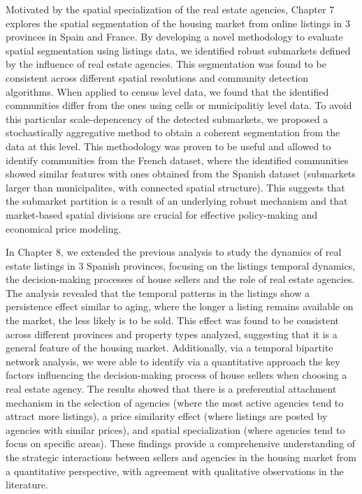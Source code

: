 Motivated by the spatial specialization of the real estate agencies, Chapter 7 explores the spatial segmentation of the housing market from online listings in 3 provinces in Spain and France. By developing a novel methodology to evaluate spatial segmentation using listings data, we identified robust submarkets defined by the influence of real estate agencies. This segmentation was found to be consistent across different spatial resolutions and community detection algorithms. When applied to census level data, we found that the identified communities differ from the ones using cells or municipalitiy level data. To avoid this particular scale-depencency of the detected submarkets, we proposed a stochastically aggregative method to obtain a coherent segmentation from the data at this level. This methodology was proven to be useful and allowed to identify communities from the French dataset, where the identified communities showed similar features with ones obtained from the Spanish dataset (submarkets larger than municipalites, with connected spatial structure). This suggests that the submarket partition is a result of an underlying robust mechanism and that market-based spatial divisions are crucial for effective policy-making and economical price modeling.

In Chapter 8, we extended the previous analysis to study the dynamics of real estate listings in 3 Spanish provinces, focusing on the listings temporal dynamics, the decision-making processes of house sellers and the role of real estate agencies. The analysis revealed that the temporal patterns in the listings show a persistence effect similar to aging, where the longer a listing remains available on the market, the less likely is to be sold. This effect was found to be consistent across different provinces and property types analyzed, suggesting that it is a general feature of the housing market. Additionally, via a temporal bipartite network analysis, we were able to identify via a quantitative approach the key factors influencing the decision-making process of house sellers when choosing a real estate agency. The results showed that there is a preferential attachment mechanism in the selection of agencies (where the most active agencies tend to attract more listings), a price similarity effect (where listings are posted by agencies with similar prices), and spatial specialization (where agencies tend to focus on specific areas). These findings provide a comprehensive understanding of the strategic interactions between sellers and agencies in the housing market from a quantitative perspective, with agreement with qualitative observations in the literature.

